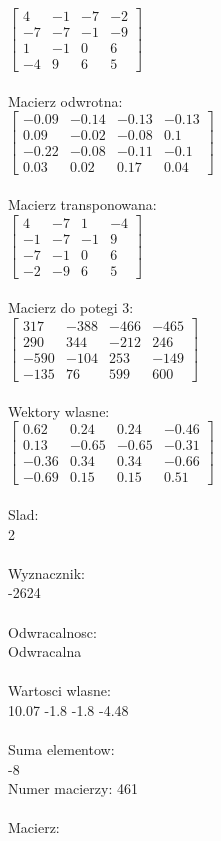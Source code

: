 \documentclass[a4paper,12pt]{article}
\begin{document}
$\begin{bmatrix} 4&-1&-7&-2\\-7&-7&-1&-9\\1&-1&0&6\\-4&9&6&5 \end{bmatrix}$
\\
\\
Macierz odwrotna:\\

$\begin{bmatrix} -0.09&-0.14&-0.13&-0.13\\0.09&-0.02&-0.08&0.1\\-0.22&-0.08&-0.11&-0.1\\0.03&0.02&0.17&0.04 \end{bmatrix}$
\\
\\
Macierz transponowana:\\

$\begin{bmatrix} 4&-7&1&-4\\-1&-7&-1&9\\-7&-1&0&6\\-2&-9&6&5 \end{bmatrix}$
\\
\\
Macierz do potegi 3:\\

$\begin{bmatrix} 317&-388&-466&-465\\290&344&-212&246\\-590&-104&253&-149\\-135&76&599&600 \end{bmatrix}$
\\
\\
Wektory wlasne:\\

$\begin{bmatrix} 0.62&0.24&0.24&-0.46\\0.13&-0.65&-0.65&-0.31\\-0.36&0.34&0.34&-0.66\\-0.69&0.15&0.15&0.51 \end{bmatrix}$
\\
\\
Slad:\\
2
\\
\\
Wyznacznik:\\
-2624
\\
\\
Odwracalnosc:\\
Odwracalna
\\
\\
Wartosci wlasne:\\
10.07 -1.8 -1.8 -4.48
\\
\\
Suma elementow:\\
-8
\\
\newpage
Numer macierzy:
461
\\
\\
Macierz:\\
\end{document}
